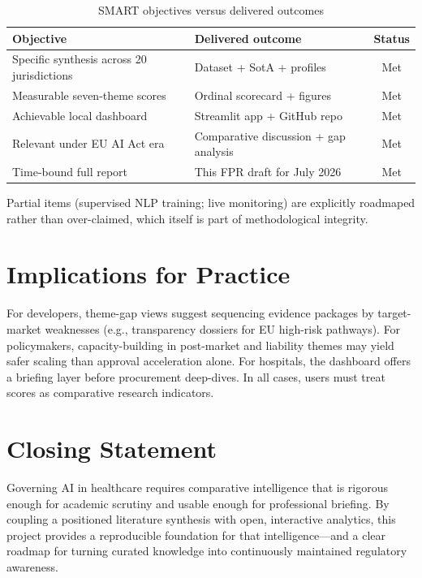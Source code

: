 \begin{table}[htbp]
\centering
\caption{SMART objectives versus delivered outcomes}
\label{tab:objcheck}
\begin{tabularx}{\textwidth}{@{}p{3.2cm} X c@{}}
\toprule
\textbf{Objective} & \textbf{Delivered outcome} & \textbf{Status} \\
\midrule
Specific synthesis across 20 jurisdictions & Dataset + SotA + profiles & Met \\
Measurable seven-theme scores & Ordinal scorecard + figures & Met \\
Achievable local dashboard & Streamlit app + GitHub repo & Met \\
Relevant under EU AI Act era & Comparative discussion + gap analysis & Met \\
Time-bound full report & This FPR draft for July 2026 & Met \\
\bottomrule
\end{tabularx}
\end{table}

Partial items (supervised NLP training; live monitoring) are explicitly roadmaped rather than over-claimed, which itself is part of methodological integrity.

\section{Implications for Practice}
\label{sec:implpractice}

For developers, theme-gap views suggest sequencing evidence packages by target-market weaknesses (e.g., transparency dossiers for EU high-risk pathways). For policymakers, capacity-building in post-market and liability themes may yield safer scaling than approval acceleration alone. For hospitals, the dashboard offers a briefing layer before procurement deep-dives. In all cases, users must treat scores as comparative research indicators.

\section{Closing Statement}

Governing AI in healthcare requires comparative intelligence that is rigorous enough for academic scrutiny and usable enough for professional briefing. By coupling a positioned literature synthesis with open, interactive analytics, this project provides a reproducible foundation for that intelligence---and a clear roadmap for turning curated knowledge into continuously maintained regulatory awareness.
